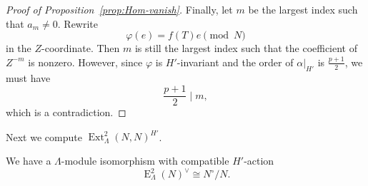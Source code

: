 \documentclass[11pt,a4paper]{article} %
\def\E{\operatorname{E}}
\def\Ext{\operatorname{Ext}} %
\begin{document}
\begin{proof}[Proof of Proposition~\ref{prop:Hom-vanish}]
    Finally, let $m$ be the largest index such that $a_m\ne0$. Rewrite 
    \[
    \varphi(e)=f(T)e\pmod{N}
    \]
    in the $Z$-coordinate. Then $m$ is still the largest index such that the coefficient of $Z^{-m}$ is nonzero. However, since $\varphi$ is $H'$-invariant and the order of $\alpha|_{H'}$ is $\frac{p+1}{2}$, we must have 
    \[
    \frac{p+1}{2}\mid m,
    \]
    which is a contradiction.
\end{proof}

Next we compute $\Ext_{\Lambda}^2(N,N)^{H'}$.

\begin{proposition}\label{prop:dual}
    We have a $\Lambda$-module isomorphism with compatible $H'$-action 
    \[
    \E_{\Lambda}^2(N)^\vee\cong N^\circ/N.
    \]
\end{proposition}
\end{document}
